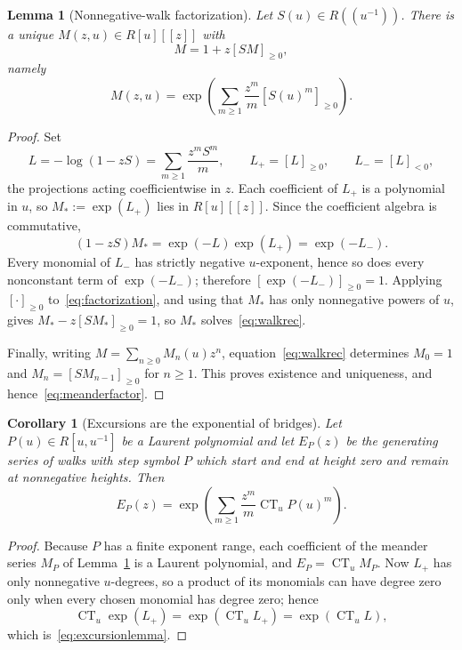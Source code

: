 \documentclass[11pt]{article}
\numberwithin{equation}{section}
\newtheorem{lemma}[theorem]{Lemma}
\newtheorem{corollary}[theorem]{Corollary}
\theoremstyle{definition}
\newcommand{\CT}{\operatorname{CT}_u}
\newcommand{\pos}[1]{\left[#1\right]_{\geq0}}
\newcommand{\negp}[1]{\left[#1\right]_{<0}}
\begin{document}
\begin{lemma}[Nonnegative-walk factorization]
\label{lem:factor}
Let $S(u)\in R((u^{-1}))$. There is a unique $M(z,u)\in R[u][[z]]$ with
\begin{equation}
 M=1+z\pos{SM},\label{eq:walkrec}
\end{equation}
namely
\begin{equation}
 M(z,u)=\exp\left(\sum_{m\geq1}\frac{z^m}{m}
                                  \pos{S(u)^m}\right).
 \label{eq:meanderfactor}
\end{equation}
\end{lemma}
\begin{proof}
Set
\[
 L=-\log(1-zS)=\sum_{m\geq1}\frac{z^mS^m}{m},\qquad
 L_+=\pos L,\qquad L_-=\negp L,
\]
the projections acting coefficientwise in $z$. Each coefficient of $L_+$ is a
polynomial in $u$, so $M_*:=\exp(L_+)$ lies in $R[u][[z]]$. Since the
coefficient algebra is commutative,
\begin{equation}
 (1-zS)M_*=\exp(-L)\exp(L_+)=\exp(-L_-).\label{eq:factorization}
\end{equation}
Every monomial of $L_-$ has strictly negative $u$-exponent, hence so does
every nonconstant term of $\exp(-L_-)$; therefore
$\pos{\exp(-L_-)}=1$. Applying $\pos{\cdot}$ to~\eqref{eq:factorization},
and using that $M_*$ has only nonnegative powers of $u$, gives
$M_*-z\pos{SM_*}=1$, so $M_*$ solves~\eqref{eq:walkrec}.

Finally, writing $M=\sum_{n\geq0}M_n(u)z^n$, equation~\eqref{eq:walkrec}
determines $M_0=1$ and $M_n=\pos{SM_{n-1}}$ for $n\geq1$. This proves
existence and uniqueness, and hence~\eqref{eq:meanderfactor}.
\end{proof}

\begin{corollary}[Excursions are the exponential of bridges]
\label{cor:excursion}
Let $P(u)\in R[u,u^{-1}]$ be a Laurent \emph{polynomial} and let $E_P(z)$ be
the generating series of walks with step symbol $P$ which start and end at
height zero and remain at nonnegative heights. Then
\begin{equation}
 E_P(z)=\exp\left(\sum_{m\geq1}\frac{z^m}{m}\CT P(u)^m\right).
 \label{eq:excursionlemma}
\end{equation}
\end{corollary}
\begin{proof}
Because $P$ has a finite exponent range, each coefficient of the meander
series $M_P$ of Lemma~\ref{lem:factor} is a Laurent polynomial, and
$E_P=\CT M_P$. Now $L_+$ has only nonnegative $u$-degrees, so a product of its
monomials can have degree zero only when every chosen monomial has degree
zero; hence
\[
 \CT\exp(L_+)=\exp(\CT L_+)=\exp(\CT L),
\]
which is~\eqref{eq:excursionlemma}.
\end{proof}
\end{document}
